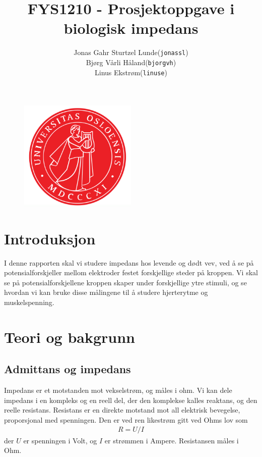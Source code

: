 \documentclass[11pt,norsk]{article}
\begin{document}
\title{FYS1210 - Prosjektoppgave i biologisk impedans}
\author{
	\begin{tabular}{rl}
        Jonas Gahr Sturtzel Lunde & (\texttt{jonassl})\\
	Bjørg Vårli Håland & (\texttt{bjorgvh})\\
	Linus Ekstrøm & (\texttt{linuse})
	\end{tabular}}
\date{}
\maketitle



\begin{figure}[H]
\centering
\includegraphics[width=0.5\textwidth]{fig/uio.png}
\end{figure}

\vfill


\pagebreak

\tableofcontents
\pagebreak



\section{Introduksjon}
I denne rapporten skal vi studere impedans hos levende og dødt vev, ved å se på potensialforskjeller mellom elektroder festet forskjellige steder på kroppen. Vi skal se på potensialforskjellene kroppen skaper under forskjellige ytre stimuli, og se hvordan vi kan bruke disse målingene til å studere hjerterytme og muskelspenning.


\section{Teori og bakgrunn}
\subsection{Admittans og impedans}
Impedans er et motstanden mot vekselstrøm, og måles i ohm. Vi kan dele impedans i en kompleks og en reell del, der den komplekse kalles reaktans, og den reelle resistans. Resistans er en direkte motstand mot all elektrisk bevegelse, proporsjonal med spenningen. Den er ved ren likestrøm gitt ved Ohms lov som
\begin{align}	R = U/I
\end{align}
der $U$ er spenningen i Volt, og $I$ er strømmen i Ampere. Resistansen måles i Ohm.
\end{document}
